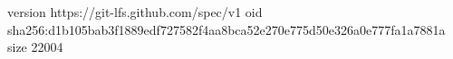 version https://git-lfs.github.com/spec/v1
oid sha256:d1b105bab3f1889edf727582f4aa8bca52e270e775d50e326a0e777fa1a7881a
size 22004
